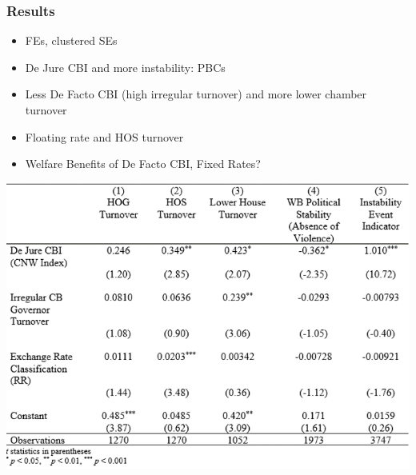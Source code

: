 \documentclass[]{beamer}
\begin{document}
\begin{frame}
    \frametitle{Results}
    \begin{itemize}
        \item FEs, clustered SEs
        \item De Jure CBI and more instability: PBCs
        \item Less De Facto CBI (high irregular turnover) and more lower chamber turnover
        \item Floating rate and HOS turnover
        \item Welfare Benefits of De Facto CBI, Fixed Rates?
    \end{itemize}
    \includegraphics{img0002.png}
\end{frame}
\end{document}
